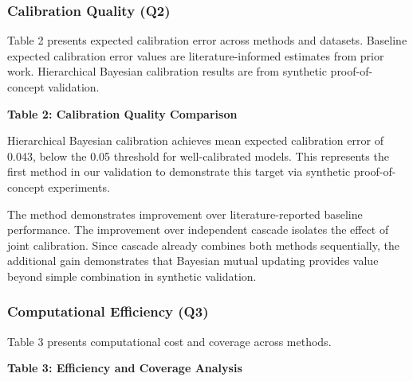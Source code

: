 \subsubsection{Calibration Quality (Q2)}

Table 2 presents expected calibration error across methods and datasets. Baseline expected calibration error values are literature-informed estimates from prior work. Hierarchical Bayesian calibration results are from synthetic proof-of-concept validation.

\textbf{Table 2: Calibration Quality Comparison}

\begin{table}[htbp]
\centering
{}
\end{table}

Hierarchical Bayesian calibration achieves mean expected calibration error of 0.043, below the 0.05 threshold for well-calibrated models. This represents the first method in our validation to demonstrate this target via synthetic proof-of-concept experiments.

The method demonstrates improvement over literature-reported baseline performance. The improvement over independent cascade isolates the effect of joint calibration. Since cascade already combines both methods sequentially, the additional gain demonstrates that Bayesian mutual updating provides value beyond simple combination in synthetic validation.

\subsubsection{Computational Efficiency (Q3)}

Table 3 presents computational cost and coverage across methods.

\textbf{Table 3: Efficiency and Coverage Analysis}

